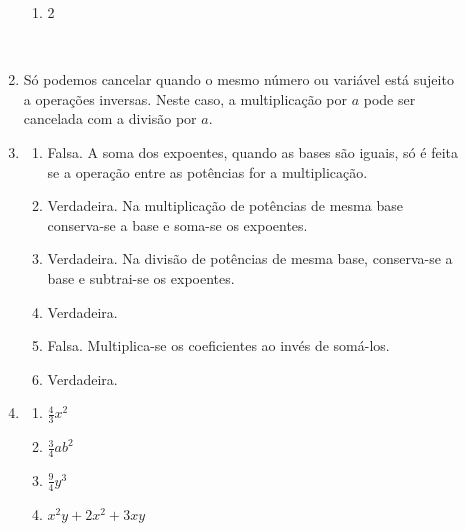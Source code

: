 \begin{description}
\begin{enumerate}[label=\textbf{\thesection.\thetempi.\thetempii}]
\begin{multicols}{4}
\begin{enumerate}[label=\alph*)]
                \item 2
            \end{enumerate}
        \end{multicols}
        
        \setcounter{tempii}{0}
        ~~
        
        \item Só podemos cancelar quando o mesmo número ou variável está sujeito a operações inversas. Neste caso, a multiplicação por $a$ pode ser cancelada com a divisão por $a$.
        
        \item \begin{enumerate}[label=\alph*)]
            \item Falsa. A soma dos expoentes, quando as bases são iguais, só é feita se a operação entre as potências for a multiplicação.
            
            \item Verdadeira. Na multiplicação de potências de mesma base conserva-se a base e soma-se os expoentes.
            
            \item Verdadeira. Na divisão de potências de mesma base, conserva-se a base e subtrai-se os expoentes.
            
            \item Verdadeira.
            
            \item Falsa. Multiplica-se os coeficientes ao invés de somá-los.
            
            \item Verdadeira.
        \end{enumerate}
        
        \item \begin{multicols}{3}
            \begin{enumerate}[label=\alph*)]
                \item $\frac{4}{3}x^2$
                
                \item $\frac{3}{4}ab^2$
                
                \item $\frac{9}{4}y^3$
                
                \item $x^2y+2x^2+3xy$
                

\end{enumerate}
\end{multicols}
\end{enumerate}
\end{description}
